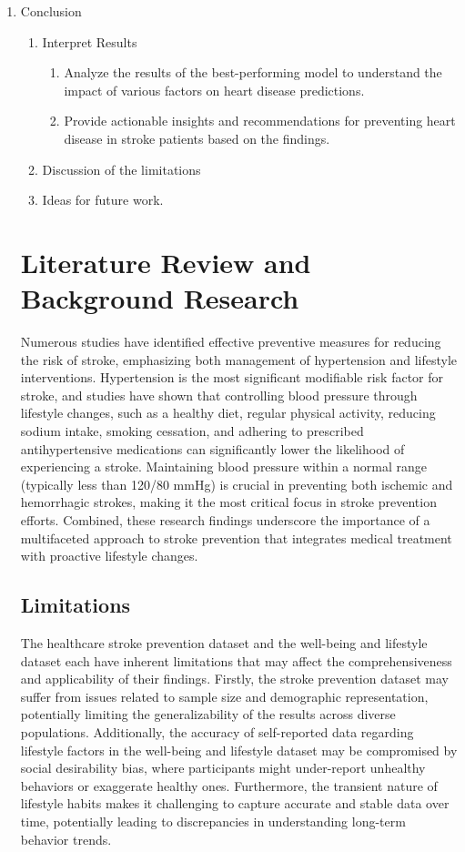 \documentclass[runningheads]{llncs}
\begin{document}
\begin{enumerate}
\item Conclusion
\begin{enumerate}
    \item Interpret Results
        \begin{enumerate}
            \item Analyze the results of the best-performing model to understand the impact of various factors on heart disease predictions. 
            \item Provide actionable insights and recommendations for preventing heart disease in stroke patients based on the findings. 
        \end{enumerate}
\item Discussion of the limitations
\item Ideas for future work.
\end{enumerate}

\section{Literature Review and Background Research}
Numerous studies have identified effective preventive measures for reducing the risk of stroke, emphasizing both management of hypertension and lifestyle interventions. \cite{sirisha2021awareness} Hypertension is the most significant modifiable risk factor for stroke, and studies have shown that controlling blood pressure through lifestyle changes, such as a healthy diet, regular physical activity, reducing sodium intake, smoking cessation, and adhering to prescribed antihypertensive medications can significantly lower the likelihood of experiencing a stroke. Maintaining blood pressure within a normal range (typically less than 120/80 mmHg) is crucial in preventing both ischemic and hemorrhagic strokes, making it the most critical focus in stroke prevention efforts. \cite{doi:10.1161/STR.0000000000000375} Combined, these research findings underscore the importance of a multifaceted approach to stroke prevention that integrates medical treatment with proactive lifestyle changes.

\subsection{Limitations}
The healthcare stroke prevention dataset and the well-being and lifestyle dataset each have inherent limitations that may affect the comprehensiveness and applicability of their findings. Firstly, the stroke prevention dataset may suffer from issues related to sample size and demographic representation, potentially limiting the generalizability of the results across diverse populations. Additionally, the accuracy of self-reported data regarding lifestyle factors in the well-being and lifestyle dataset may be compromised by social desirability bias, where participants might under-report unhealthy behaviors or exaggerate healthy ones. Furthermore, the transient nature of lifestyle habits makes it challenging to capture accurate and stable data over time, potentially leading to discrepancies in understanding long-term behavior trends.


\end{enumerate}
\end{document}
